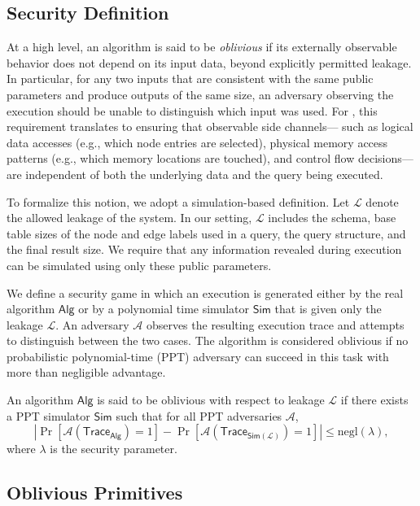 \subsection{Security Definition}
\label{sub:sec-definition}

At a high level, an algorithm is said to be \emph{oblivious} if its externally observable 
behavior does not depend on its input data, beyond explicitly permitted leakage. In particular, 
for any two inputs that are consistent with the same public parameters and produce outputs of 
the same size, an adversary observing the execution should be unable to distinguish which input 
was used. For \system, this requirement translates to ensuring that observable side channels—
such as logical data accesses (e.g., which node entries are selected), physical memory access 
patterns (e.g., which memory locations are touched), and control flow decisions—are independent 
of both the underlying data and the query being executed.

To formalize this notion, we adopt a simulation-based definition. Let $\mathcal{L}$ denote the
allowed leakage of the system. In our setting, $\mathcal{L}$ includes the schema, base table 
sizes of the node and edge labels used in a query, the query structure, and the final result size. We require that any information 
revealed during execution can be simulated using only these public parameters.

We define a security game in which an execution is generated either by the real algorithm 
$\mathsf{Alg}$ or by a polynomial time simulator $\mathsf{Sim}$ that is given only the leakage 
$\mathcal{L}$. An adversary $\mathcal{A}$ observes the resulting execution trace and attempts 
to distinguish between the two cases. The algorithm is considered oblivious if no probabilistic 
polynomial-time (PPT) adversary can succeed in this task with more than negligible advantage.

\begin{definition}
An algorithm $\mathsf{Alg}$ is said to be oblivious with respect to leakage $\mathcal{L}$ if there exists a PPT simulator $\mathsf{Sim}$ such that for all PPT adversaries $\mathcal{A}$,
\[
\left| 
\Pr\left[\mathcal{A}(\mathsf{Trace}_{\mathsf{Alg}}) = 1\right] 
- 
\Pr\left[\mathcal{A}(\mathsf{Trace}_{\mathsf{Sim}(\mathcal{L})}) = 1\right] 
\right| \leq \mathrm{negl}(\lambda),
\]
where $\lambda$ is the security parameter.
\label{sec-def}
\end{definition}

\subsection{Oblivious Primitives}
\label{sub:obl-primitives}

